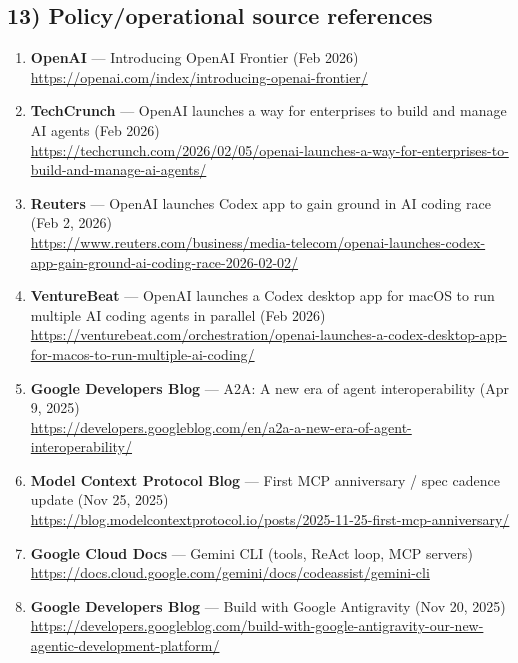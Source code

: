 \documentclass[11pt]{article}
\begin{document}
\hypertarget{policyoperational-source-references}{%
\subsection{13) Policy/operational source
references}\label{policyoperational-source-references}}

\begin{enumerate}
\def\labelenumi{\arabic{enumi}.}
\tightlist
\item
  \textbf{OpenAI} --- Introducing OpenAI Frontier (Feb 2026)\\
  \url{https://openai.com/index/introducing-openai-frontier/}
\item
  \textbf{TechCrunch} --- OpenAI launches a way for enterprises to build
  and manage AI agents (Feb 2026)\\
  \url{https://techcrunch.com/2026/02/05/openai-launches-a-way-for-enterprises-to-build-and-manage-ai-agents/}
\item
  \textbf{Reuters} --- OpenAI launches Codex app to gain ground in AI
  coding race (Feb 2, 2026)\\
  \url{https://www.reuters.com/business/media-telecom/openai-launches-codex-app-gain-ground-ai-coding-race-2026-02-02/}
\item
  \textbf{VentureBeat} --- OpenAI launches a Codex desktop app for macOS
  to run multiple AI coding agents in parallel (Feb 2026)\\
  \url{https://venturebeat.com/orchestration/openai-launches-a-codex-desktop-app-for-macos-to-run-multiple-ai-coding/}
\item
  \textbf{Google Developers Blog} --- A2A: A new era of agent
  interoperability (Apr 9, 2025)\\
  \url{https://developers.googleblog.com/en/a2a-a-new-era-of-agent-interoperability/}
\item
  \textbf{Model Context Protocol Blog} --- First MCP anniversary / spec
  cadence update (Nov 25, 2025)\\
  \url{https://blog.modelcontextprotocol.io/posts/2025-11-25-first-mcp-anniversary/}
\item
  \textbf{Google Cloud Docs} --- Gemini CLI (tools, ReAct loop, MCP
  servers)\\
  \url{https://docs.cloud.google.com/gemini/docs/codeassist/gemini-cli}
\item
  \textbf{Google Developers Blog} --- Build with Google Antigravity (Nov
  20, 2025)\\
  \url{https://developers.googleblog.com/build-with-google-antigravity-our-new-agentic-development-platform/}

\end{enumerate}
\end{document}
